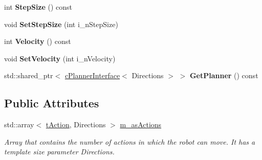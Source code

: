 \begin{DoxyCompactItemize}
int {\bfseries Step\+Size} () const
\item 
\mbox{\label{classplanner_1_1c_rover_interface_ac6410b636f0f2d5614e3463912f9646f}} 
void {\bfseries Set\+Step\+Size} (int i\+\_\+n\+Step\+Size)
\item 
\mbox{\label{classplanner_1_1c_rover_interface_a65279be04ab88f54d69204087503448b}} 
int {\bfseries Velocity} () const
\item 
\mbox{\label{classplanner_1_1c_rover_interface_a209a069d48223e427e27e4582037b158}} 
void {\bfseries Set\+Velocity} (int i\+\_\+n\+Velocity)
\item 
\mbox{\label{classplanner_1_1c_rover_interface_aeab2cd88b65b86f42cfbb5b063d3f9d1}} 
std\+::shared\+\_\+ptr$<$ \mbox{\hyperlink{classplanner_1_1c_planner_interface}{c\+Planner\+Interface}}$<$ Directions $>$ $>$ {\bfseries Get\+Planner} () const
\end{DoxyCompactItemize}
\subsection*{Public Attributes}
\begin{DoxyCompactItemize}
\item 
\mbox{\label{classplanner_1_1c_rover_interface_ae706ad1952c9761f6183d4776b3aabec}} 
std\+::array$<$ \mbox{\hyperlink{structplanner_1_1t_action}{t\+Action}}, Directions $>$ \mbox{\hyperlink{classplanner_1_1c_rover_interface_ae706ad1952c9761f6183d4776b3aabec}{m\+\_\+as\+Actions}}
\begin{DoxyCompactList}\small\item\em Array that contains the number of actions in which the robot can move. It has a template size parameter Directions. \end{DoxyCompactList}\end{DoxyCompactItemize}
